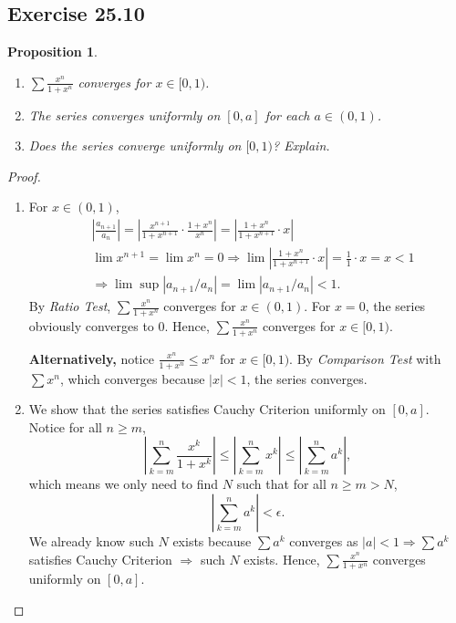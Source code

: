 \documentclass{article}
\newtheorem{proposition}[thm]{Proposition}
\renewcommand*{\implies}{\ensuremath{\Longrightarrow}}
\begin{document}
\subsection*{Exercise 25.10}
\begin{proposition}\indent
    \begin{enumerate}[label=\textbf{(\alph*)}]
        \item $\sum\frac{x^n}{1+x^n}$ converges for $x\in[0,1)$.
        \item The series converges uniformly on $[0,a]$ for each $a\in(0,1)$.
        \item Does the series converge uniformly on $[0,1)$? Explain.
    \end{enumerate}
\end{proposition}
\begin{proof}\indent
    \begin{enumerate}[label=\textbf{(\alph*)}]
        \item For $x\in(0,1)$, 
        \begin{align*}
            & \left|\frac{a_{n+1}}{a_n}\right|=\left|\frac{x^{n+1}}{1+x^{n+1}}\cdot \frac{1+x^n}{x^n}\right| = 
            \left|\frac{1+x^n}{1+x^{n+1}}\cdot x\right| \\
            & \lim x^{n+1} = \lim x^n = 0 \implies \lim \left|\frac{1+x^n}{1+x^{n+1}}\cdot x\right| 
            = \frac{1}{1}\cdot x = x < 1 \\
            & \implies \lim\sup|a_{n+1}/a_n|=\lim|a_{n+1}/a_n|<1.
        \end{align*}
        By \emph{Ratio Test}, $\sum\frac{x^n}{1+x^n}$ converges for $x\in(0,1)$. 
        For $x=0$, the series obviously converges to 0. Hence, 
        $\sum\frac{x^n}{1+x^n}$ converges for $x\in[0,1)$.

        \textbf{Alternatively,} notice $\frac{x^n}{1+x^n}\le x^n$ for $x\in[0,1)$. By 
        \emph{Comparison Test} with $\sum x^n$, which converges because $|x|<1$, the series 
        converges.

        \item We show that the series satisfies Cauchy Criterion uniformly on $[0,a]$. Notice for 
        all $n\ge m$, $$\left|\sum_{k=m}^{n}\frac{x^k}{1+x^k}\right|\le 
        \left|\sum_{k=m}^{n}x^k\right|\le \left|\sum_{k=m}^{n}a^k\right|,$$
        which means we only need to find $N$ such that for all $n\ge m> N$,
        $$\left|\sum_{k=m}^{n}a^k\right|<\epsilon.$$ We already know such $N$ exists 
        because $\sum a^k$ converges as $|a|<1\implies\sum a^k$ satisfies Cauchy Criterion
        $\implies$ such $N$ exists. Hence, $\sum\frac{x^n}{1+x^n}$ converges uniformly on $[0,a]$.


\end{enumerate}
\end{proof}
\end{document}

